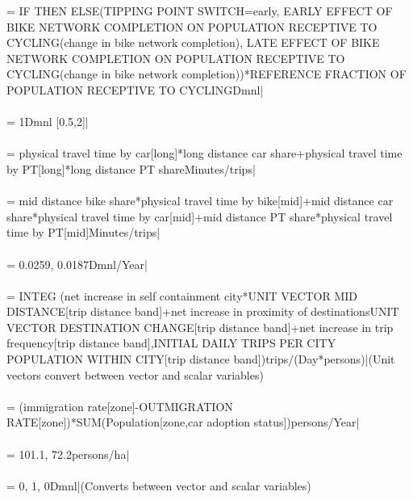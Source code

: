  = {\small IF THEN ELSE(TIPPING POINT SWITCH=early, EARLY EFFECT OF BIKE NETWORK COMPLETION ON POPULATION RECEPTIVE TO CYCLING(change in bike network completion), LATE EFFECT OF BIKE NETWORK COMPLETION ON POPULATION RECEPTIVE TO CYCLING(change in bike network completion))*REFERENCE FRACTION OF POPULATION RECEPTIVE TO CYCLINGDmnl|} \\ \\ 
 = {\small 1Dmnl [0.5,2]|} \\ \\ 
 = {\small physical travel time by car[long]*long distance car share+physical travel time by PT[long]*long distance PT shareMinutes/trips|} \\ \\ 
 = {\small mid distance bike share*physical travel time by bike[mid]+mid distance car share*physical travel time by car[mid]+mid distance PT share*physical travel time by PT[mid]Minutes/trips|} \\ \\ 
 = {\small 0.0259, 0.0187Dmnl/Year|} \\ \\ 
 = {\small  INTEG (net increase in self containment city*UNIT VECTOR MID DISTANCE[trip distance band]+net increase in proximity of destinations\*UNIT VECTOR DESTINATION CHANGE[trip distance band]+net increase in trip frequency[trip distance band],INITIAL DAILY TRIPS PER CITY POPULATION WITHIN CITY[trip distance band])trips/(Day*persons)|}{\small  (Unit vectors convert between vector and scalar variables)} \\ \\ 
 = {\small (immigration rate[zone]-OUTMIGRATION RATE[zone])*SUM(Population[zone,car adoption status\!])persons/Year|} \\ \\ 
 = {\small 101.1, 72.2persons/ha|} \\ \\ 
 = {\small 0, 1, 0Dmnl|}{\small  (Converts between vector and scalar variables)} \\ \\ 

